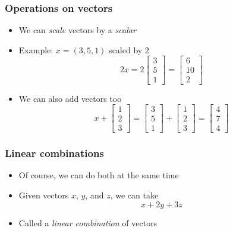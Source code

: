 \documentclass{beamer}
\begin{document}
    \begin{frame}
        \frametitle{Operations on vectors}
        \begin{itemize}\itemsep=12pt
            \item We can \emph{scale} vectors by a \emph{scalar}
            \item Example: $x=(3,5,1)$ scaled by $2$
            \[
                2x = 2\begin{bmatrix}
                    3\\
                    5\\
                    1
                \end{bmatrix}
                = \begin{bmatrix}
                    6\\
                    10\\
                    2
                \end{bmatrix}
            \]
            \vspace{-2em}
            \pause
            \item We can also add vectors too
            \[
                x+\begin{bmatrix}
                    1\\
                    2\\
                    3
                    \end{bmatrix}
                = \begin{bmatrix}
                    3\\
                    5\\
                    1
                \end{bmatrix}
                + \begin{bmatrix}
                    1\\
                    2\\
                    3
                    \end{bmatrix}
                = \begin{bmatrix}
                    4\\
                    7\\
                    4
                \end{bmatrix}
            \]
        \end{itemize}
    \end{frame}
    \begin{frame}
        \frametitle{Linear combinations}
        \begin{itemize}\itemsep=12pt
            \item Of course, we can do both at the same time
            \item Given vectors $x$, $y$, and $z$, we can take
            \[
                x + 2y + 3z
            \]
            \item Called a \emph{linear combination} of vectors
        \end{itemize}
    \end{frame}
\end{document}

